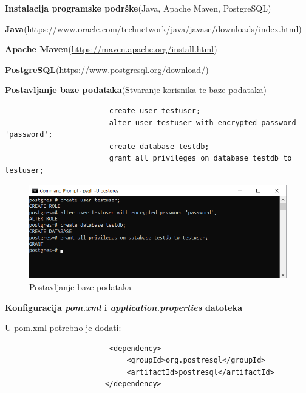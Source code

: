 		
		   	\noindent {}
		   	\begin{packed_enum}
				
					\item \textbf{Instalacija programske podrške}(Java, Apache Maven, PostgreSQL)
    					\begin{packed_item}
                			\item \textbf{Java}(\url{https://www.oracle.com/technetwork/java/javase/downloads/index.html})
                			\item \textbf{Apache Maven}(\url{https://maven.apache.org/install.html})
                			\item \textbf{PostgreSQL}(\url{https://www.postgresql.org/download/})
    		      \end{packed_item}
					\item \textbf{Postavljanje baze podataka}(Stvaranje korisnika te baze podataka)
					    \begin{verbatim}
					    create user testuser;
					    alter user testuser with encrypted password 'password';
					    create database testdb;
					    grant all privileges on database testdb to testuser;
			            \end{verbatim}
			            
    					\begin{figure}[H]
    					\includegraphics[scale=1]{slike/backend/psqlsetup.png}
    					\centering
    					\caption{Postavljanje baze podataka}
    					\label{fig:PSQL-setup}
    		            \end{figure}
    		            
		            \item \textbf{Konfiguracija \textit{pom.xml} i \textit{application.properties} datoteka}
		                \begin{packed_item}
                			\item {U pom.xml potrebno je dodati:} 
                			\begin{verbatim}
					    <dependency>
					        <groupId>org.postresql</groupId>
					        <artifactId>postresql</artifactId>
					   </dependency>
			            \end{verbatim}
                			    

\end{packed_item}
\end{packed_enum}
